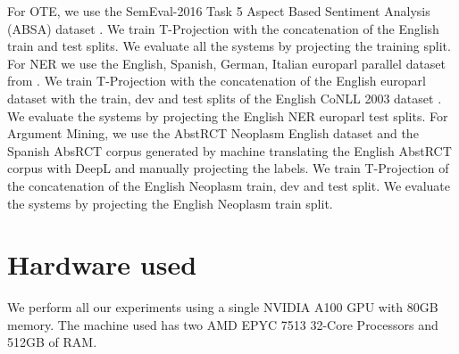 \documentclass[11pt]{article}
\begin{document}
For OTE, we use the SemEval-2016 Task 5 Aspect Based Sentiment Analysis (ABSA) dataset \cite{pontiki-etal-2016-semeval}. We train T-Projection with the concatenation of the English train and test splits. We evaluate all the systems by projecting the training split. 
For NER we use the English, Spanish, German, Italian europarl parallel dataset from \cite{agerri-etal-2018-building}. We train T-Projection with the concatenation of the English europarl dataset with the train, dev and test splits of the English CoNLL 2003 dataset \cite{tjong-kim-sang-de-meulder-2003-introduction}. We evaluate the systems by projecting the English NER europarl test splits.
For Argument Mining, we use the AbstRCT Neoplasm English dataset \cite{DBLP:conf/ecai/0002CV20} and the Spanish AbsRCT corpus generated by machine translating the English AbstRCT corpus with DeepL and manually projecting the labels. We train T-Projection of the concatenation of the English Neoplasm train, dev and test split. We evaluate the systems by projecting the English Neoplasm train split. 


\section{Hardware used}
We perform all our experiments using a single NVIDIA A100 GPU with 80GB memory. The machine used has two AMD EPYC 7513 32-Core Processors and 512GB of RAM.
\end{document}
